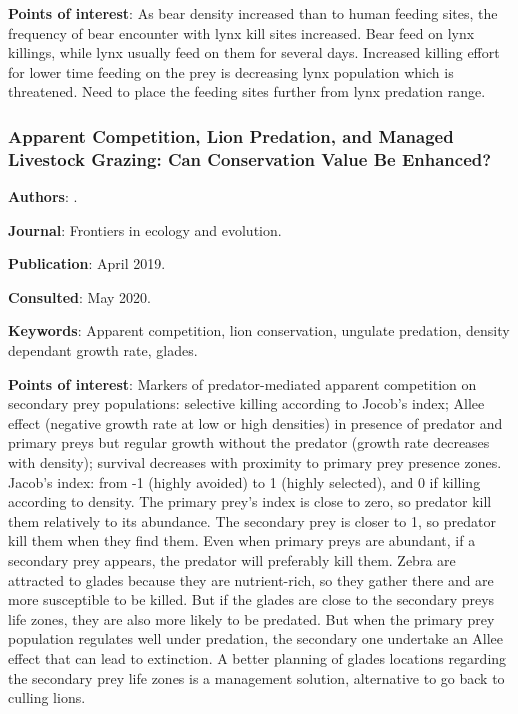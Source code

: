 \documentclass[12pt,a4paper]{article}
\begin{document}
\textbf{Points of interest}: As bear density increased than to human feeding sites, the frequency of bear encounter with lynx kill sites increased. Bear feed on lynx killings, while lynx usually feed on them for several days. Increased killing effort for lower time feeding on the prey is decreasing lynx population which is threatened. Need to place the feeding sites further from lynx predation range.

\newpage

\subsubsection*{Apparent Competition, Lion Predation, and Managed Livestock Grazing: Can Conservation Value Be Enhanced?}

\textbf{Authors}: \cite{ngweno2019apparent}.

\textbf{Journal}: Frontiers in ecology and evolution.

\textbf{Publication}: April 2019.

\textbf{Consulted}: May 2020.

\textbf{Keywords}: Apparent competition, lion conservation, ungulate predation, density dependant growth rate, glades.

\textbf{Points of interest}:
Markers of predator-mediated apparent competition on secondary prey populations: selective killing according to Jocob's index; Allee effect (negative growth rate at low or high densities) in presence of predator and primary preys but regular growth without the predator (growth rate decreases with density); survival decreases with proximity to primary prey presence zones.
Jacob's index: from -1 (highly avoided) to 1 (highly selected), and 0 if killing according to density.
The primary prey's index is close to zero, so predator kill them relatively to its abundance. The secondary prey is closer to 1, so predator kill them when they find them. Even when primary preys are abundant, if a secondary prey appears, the predator will preferably kill them.
Zebra are attracted to glades because they are nutrient-rich, so they gather there and are more susceptible to be killed. But if the glades are close to the secondary preys life zones, they are also more likely to be predated. But when the primary prey population regulates well under predation, the secondary one undertake an Allee effect that can lead to extinction.
A better planning of glades locations regarding the secondary prey life zones is a management solution, alternative to go back to culling lions.
\end{document}
